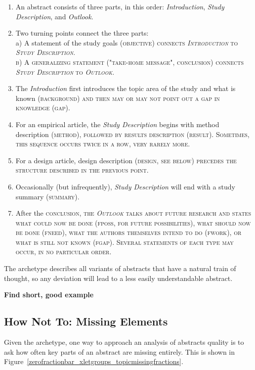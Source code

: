 \documentclass[10pt,journal,compsoc]{IEEEtran}
\newcommand{\Cb}[1]{\bgroup\scshape #1\egroup}  %
\newcommand{\Todo}[1]{\bgroup\bfseries\Large #1\egroup}
\begin{document}
\begin{enumerate}
\item An abstract consists of three parts, in this order:
   \emph{Introduction}, \emph{Study Description}, and \emph{Outlook}.
\item Two turning points connect the three parts:\\
   a) A statement of the study goals (\Cb{objective}) connects \emph{Introduction}
      to \emph{Study Description}.\\
   b) A generalizing statement ("take-home message", \Cb{conclusion})
     connects \emph{Study Description} to \emph{Outlook}.
\item The \emph{Introduction} first introduces the topic area of the study and what is known (\Cb{background})
   and then may or may not point out a gap in knowledge (\Cb{gap}).
\item For an empirical article, the \emph{Study Description} begins with
   method description (\Cb{method}), followed by results description (\Cb{result}).
   Sometimes, this sequence occurs twice in a row, very rarely more.
\item For a design article, design description (\Cb{design}, see below) precedes the structure
   described in the previous point.
\item Occasionally (but infrequently), \emph{Study Description} will end with a study summary (\Cb{summary}).
\item After the \Cb{conclusion}, the \emph{Outlook} talks about future research and states
   what could now be done (\Cb{fposs}, for future possibilities),
   what should now be done (\Cb{fneed}),
   what the authors themselves intend to do (\Cb{fwork}), or
   what is still not known (\Cb{fgap}).
   Several statements of each type may occur, in no particular order.
\end{enumerate}

The archetype describes all variants of abstracts that have a natural train of thought,
so any deviation will lead to a less easily understandable abstract.

\Todo{Find short, good example}


\subsection{How Not To: Missing Elements}

Given the archetype, one way to approach an analysis of abstracts quality is to ask
how often key parts of an abstract are missing entirely.
This is shown in Figure~\ref{zerofractionbar_xletgroups_topicmissingfractions}.
\end{document}
